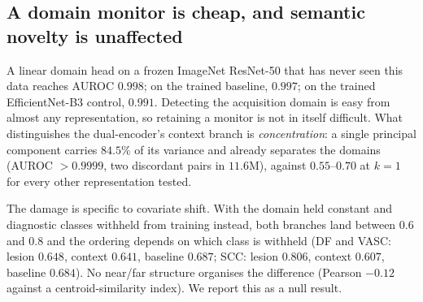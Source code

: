 \subsection{A domain monitor is cheap, and semantic novelty is unaffected}

A linear domain head on a frozen ImageNet ResNet-50 that has never seen this data
reaches AUROC $0.998$; on the trained baseline, $0.997$; on the trained EfficientNet-B3
control, $0.991$. Detecting the acquisition domain is easy from almost any
representation, so retaining a monitor is not in itself difficult. What distinguishes
the dual-encoder's context branch is \emph{concentration}: a single principal component
carries $84.5\%$ of its variance and already separates the domains
(AUROC $>0.9999$, two discordant pairs in $11.6$M), against $0.55$--$0.70$ at $k = 1$
for every other representation tested.

The damage is specific to covariate shift. With the domain held constant and diagnostic
classes withheld from training instead, both branches land between $0.6$ and $0.8$ and
the ordering depends on which class is withheld (DF and VASC: lesion $0.648$, context
$0.641$, baseline $0.687$; SCC: lesion $0.806$, context $0.607$, baseline $0.684$). No
near/far structure organises the difference (Pearson $-0.12$ against a
centroid-similarity index). We report this as a null result.




